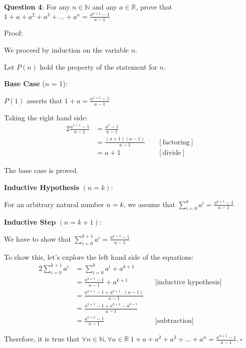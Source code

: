 \documentclass{article} %
\newcommand{\question}[2][]{\begin{flushleft}
        \textbf{Question #1}: #2

\end{flushleft}}
\begin{document}
    \question[4]{For any $n \in \mathbb{N}$ and any $a \in \mathbb{R}$, prove that $1 + a + a^2 + a^3 + ... + a^n = \frac{a^{n + 1} - 1}{a - 1}$}

    Proof:

    We proceed by induction on the variable $n$.

    Let $P(n)$ hold the property of the statement for $n$.

    \textbf{Base Case} ($n$ = 1):

    $P(1)$ asserts that $1 + a = \frac{a^{1 + 1} - 1}{a-1}$

    Taking the right hand side:
    \begin{alignat*}{2}
        \frac{a^{1 + 1} - 1}{a-1} &= \frac{a^2 - 1}{a-1}\\
        &= \frac{(a+1)(a-1)}{a-1}\ && [\text{factoring}]\\
        &= a + 1&& [\text{divide}]
    \end{alignat*}

    The base case is proved.

    \textbf{Inductive Hypothesis} $(n = k)$:

    For an arbitrary natural number $n = k$, we assume that $\sum _{i = 0}^ka^i = \frac{a^{k+1} - 1}{a - 1}$

    \textbf{Inductive Step} $(n = k + 1)$:

    We have to show that $\sum _{i = 0}^{k + 1}a^i = \frac{a^{k+2} - 1}{a - 1}$

    To show this, let's explore the left hand side of the equations:
    \begin{alignat*}{2}
        \sum _{i = 0}^{k + 1}a^i &= \sum _{i = 0}^{k}a^i + a^{k + 1} \\
        &= \frac{a^{k+1} - 1}{a - 1} + a^{k + 1} &&\text{[inductive hypothesis]}\\
        &= \frac{a^{k+1} - 1 + a^{k + 1} \cdot (a - 1)}{a - 1} \\
        &= \frac{a^{k+1} - 1 + a^{k + 2} - a^{k + 1}}{a - 1} \\
        &= \frac{a^{k+2} - 1}{a - 1} &&\text{[subtraction]}
    \end{alignat*}

    Therefore, it is true that $\forall n \in \mathbb{N}, \forall a \in \mathbb{R}\ 1 + a + a^2 + a^3 + ... + a^n = \frac{a^{n + 1} - 1}{a - 1}.\ \square$

    \newpage

                                                                   
\end{document}
